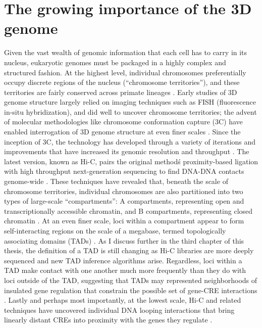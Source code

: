 \section{The growing importance of the 3D genome}
Given the vast wealth of genomic information that each cell has to carry in its nucleus, eukaryotic genomes must be packaged in a highly complex and structured fashion. At the highest level, individual chromosomes preferentially occupy discrete regions of the nucleus (``chromosome territories''), and these territories are fairly conserved across primate lineages \cite{Meaburn.2007, Mora.2006, Tanabe.2002}. Early studies of 3D genome structure largely relied on imaging techniques such as FISH (fluorescence in-situ hybridization), and did well to uncover chromosome territories; the advent of molecular methodologies like chromosome conformation capture (3C) have enabled interrogation of 3D genome structure at even finer scales \cite{Dekker.2002}. Since the inception of 3C, the technology has developed through a variety of iterations and improvements that have increased its genomic resolution and throughput \cite{Fraser.2015}. The latest version, known as Hi-C, pairs the original method\'s proximity-based ligation with high throughput next-generation sequencing to find DNA-DNA contacts genome-wide \cite{Lieberman-Aiden.2009}. These techniques have revealed that, beneath the scale of chromosome territories, individual chromosomes are also partitioned into two types of large-scale ``compartments'': A compartments, representing open and transcriptionally accessible chromatin, and B compartments, representing closed chromatin \cite{Lieberman-Aiden.2009, Naumova.2010}. At an even finer scale, loci within a compartment appear to form self-interacting regions on the scale of a megabase, termed topologically associating domains (TADs) \cite{Dixon.2012, Nora.2012, Hou.2012, Sexton.2012}. As I discuss further in the third chapter of this thesis, the definition of a TAD is still changing as Hi-C libraries are more deeply sequenced and new TAD inference algorithms arise. Regardless, loci within a TAD make contact with one another much more frequently than they do with loci outside of the TAD, suggesting that TADs may represented neighborhoods of insulated gene regulation that constrain the possible set of gene-CRE interactions \cite{Andrey.2017, Symmons.2014, Sexton.2015}. Lastly and perhaps most importantly, at the lowest scale, Hi-C and related techniques have uncovered individual DNA looping interactions that bring linearly distant CREs into proximity with the genes they regulate \cite{Rao.2014, Kadauke.2009}.

